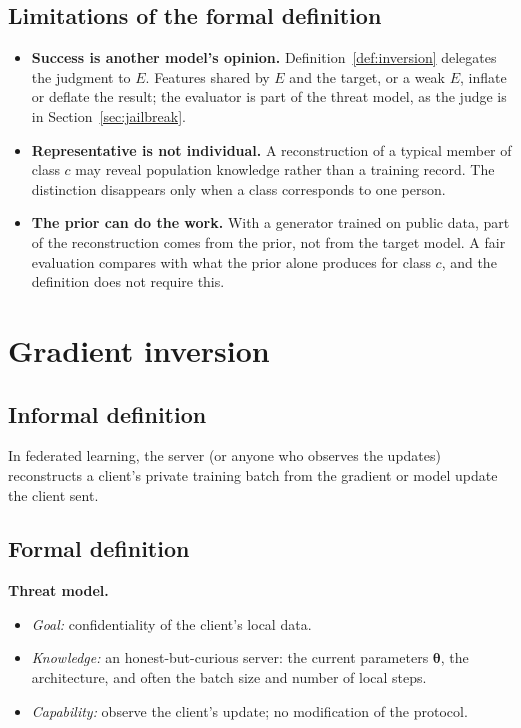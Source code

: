 \documentclass[10pt,a4paper]{extarticle}
\theoremstyle{definition}
\newcommand{\btheta}{\boldsymbol{\theta}}
\newcommand{\threatmodel}[3]{%
\par\noindent\textbf{Threat model.}
\begin{itemize}[leftmargin=1.5em]
  \item \emph{Goal:} #1
  \item \emph{Knowledge:} #2
  \item \emph{Capability:} #3
\end{itemize}\par}
\begin{document}
\subsection{Limitations of the formal definition}

\begin{itemize}[leftmargin=1.5em]
  \item \textbf{Success is another model's opinion.} Definition~\ref{def:inversion} delegates the judgment to $E$. Features shared by $E$ and the target, or a weak $E$, inflate or deflate the result; the evaluator is part of the threat model, as the judge is in Section~\ref{sec:jailbreak}.
  \item \textbf{Representative is not individual.} A reconstruction of a typical member of class $c$ may reveal population knowledge rather than a training record. The distinction disappears only when a class corresponds to one person.
  \item \textbf{The prior can do the work.} With a generator trained on public data, part of the reconstruction comes from the prior, not from the target model. A fair evaluation compares with what the prior alone produces for class $c$, and the definition does not require this.
\end{itemize}

\section{Gradient inversion}\label{sec:gradinv}

\subsection{Informal definition}

In federated learning, the server (or anyone who observes the updates) reconstructs a client's private training batch from the gradient or model update the client sent.

\subsection{Formal definition}

\threatmodel{confidentiality of the client's local data.}{an honest-but-curious server: the current parameters $\btheta$, the architecture, and often the batch size and number of local steps.}{observe the client's update; no modification of the protocol.}
\end{document}
